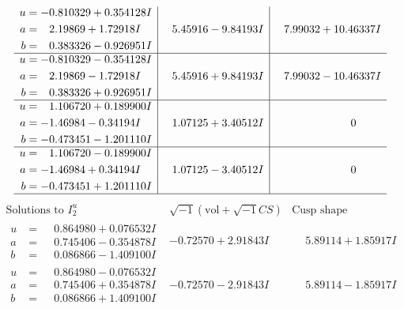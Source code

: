 \documentclass[1p]{elsarticle_modified}
\theoremstyle{definition}
\newcommand{\I}{\sqrt{-1}}
\begin{document}
$$\begin{array}{c|c|c}
\begin{aligned}
u &= -0.810329 + 0.354128 I \\
a &= \phantom{-}2.19869 + 1.72918 I \\
b &= \phantom{-}0.383326 - 0.926951 I\end{aligned}
 & \phantom{-}5.45916 - 9.84193 I & \phantom{-}7.99032 + 10.46337 I \\ \hline\begin{aligned}
u &= -0.810329 - 0.354128 I \\
a &= \phantom{-}2.19869 - 1.72918 I \\
b &= \phantom{-}0.383326 + 0.926951 I\end{aligned}
 & \phantom{-}5.45916 + 9.84193 I & \phantom{-}7.99032 - 10.46337 I \\ \hline\begin{aligned}
u &= \phantom{-}1.106720 + 0.189900 I \\
a &= -1.46984 - 0.34194 I \\
b &= -0.473451 - 1.201110 I\end{aligned}
 & \phantom{-}1.07125 + 3.40512 I & \phantom{-0.000000 } 0 \\ \hline\begin{aligned}
u &= \phantom{-}1.106720 - 0.189900 I \\
a &= -1.46984 + 0.34194 I \\
b &= -0.473451 + 1.201110 I\end{aligned}
 & \phantom{-}1.07125 - 3.40512 I & \phantom{-0.000000 } 0\\
 \hline 
 \end{array}$$\newpage$$\begin{array}{c|c|c}  
\text{Solutions to }I^u_{2}& \I (\text{vol} + \sqrt{-1}CS) & \text{Cusp shape}\\
 \hline 
\begin{aligned}
u &= \phantom{-}0.864980 + 0.076532 I \\
a &= \phantom{-}0.745406 - 0.354878 I \\
b &= \phantom{-}0.086866 - 1.409100 I\end{aligned}
 & -0.72570 + 2.91843 I & \phantom{-}5.89114 + 1.85917 I \\ \hline\begin{aligned}
u &= \phantom{-}0.864980 - 0.076532 I \\
a &= \phantom{-}0.745406 + 0.354878 I \\
b &= \phantom{-}0.086866 + 1.409100 I\end{aligned}
 & -0.72570 - 2.91843 I & \phantom{-}5.89114 - 1.85917 I \\ \hline\begin{aligned}

\end{aligned}
\end{array}$$
\end{document}

